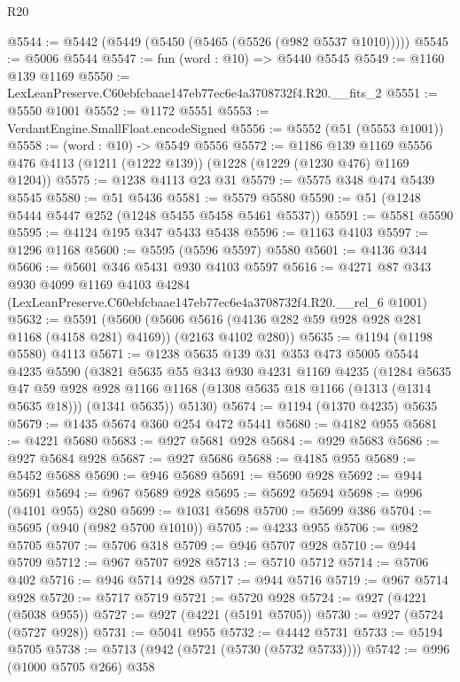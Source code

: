 \begin{lexlean}{R20}
\begin{coremodule}
@5544 := @5442 (@5449 (@5450 (@5465 (@5526 (@982 @5537 @1010)))))
@5545 := @5006 @5544
@5547 := fun (word : @10) => @5440 @5545
@5549 := @1160 @139 @1169
@5550 := LexLeanPreserve.C60ebfcbaae147eb77ec6e4a3708732f4.R20.__fits_2
@5551 := @5550 @1001
@5552 := @1172 @5551
@5553 := VerdantEngine.SmallFloat.encodeSigned
@5556 := @5552 (@51 (@5553 @1001))
@5558 := (word : @10) -> @5549 @5556
@5572 := @1186
    @139
    @1169
    @5556
    @476
    @4113
    (@1211 (@1222 @139))
    (@1228 (@1229 (@1230 @476) @1169 @1204))
@5575 := @1238 @4113 @23 @31
@5579 := @5575 @348 @474 @5439 @5545
@5580 := @51 @5436
@5581 := @5579 @5580
@5590 := @51 (@1248 @5444 @5447 @252 (@1248 @5455 @5458 @5461 @5537))
@5591 := @5581 @5590
@5595 := @4124 @195 @347 @5433 @5438
@5596 := @1163 @4103
@5597 := @1296 @1168
@5600 := @5595 (@5596 @5597) @5580
@5601 := @4136 @344
@5606 := @5601 @346 @5431 @930 @4103 @5597
@5616 := @4271
    @87
    @343
    @930
    @4099
    @1169
    @4103
    @4284
    (LexLeanPreserve.C60ebfcbaae147eb77ec6e4a3708732f4.R20.__rel_6 @1001)
@5632 := @5591
    (@5600
      (@5606 @5616 (@4136 @282 @59 @928 @928 @281 @1168 (@4158 @281) @4169))
      (@2163 @4102 @280))
@5635 := @1194 (@1198 @5580) @4113
@5671 := @1238
    @5635
    @139
    @31
    @353
    @473
    @5005
    @5544
    @4235
    @5590
    (@3821
      @5635
      @55
      @343
      @930
      @4231
      @1169
      @4235
      (@1284
        @5635
        @47
        @59
        @928
        @928
        @1166
        @1168
        (@1308 @5635 @18 @1166 (@1313 (@1314 @5635 @18)))
        (@1341 @5635))
      @5130)
@5674 := @1194 (@1370 @4235) @5635
@5679 := @1435 @5674 @360 @254 @472 @5441
@5680 := @4182 @955
@5681 := @4221 @5680
@5683 := @927 @5681 @928
@5684 := @929 @5683
@5686 := @927 @5684 @928
@5687 := @927 @5686
@5688 := @4185 @955
@5689 := @5452 @5688
@5690 := @946 @5689
@5691 := @5690 @928
@5692 := @944 @5691
@5694 := @967 @5689 @928
@5695 := @5692 @5694
@5698 := @996 (@4101 @955) @280
@5699 := @1031 @5698
@5700 := @5699 @386
@5704 := @5695 (@940 (@982 @5700 @1010))
@5705 := @4233 @955
@5706 := @982 @5705
@5707 := @5706 @318
@5709 := @946 @5707 @928
@5710 := @944 @5709
@5712 := @967 @5707 @928
@5713 := @5710 @5712
@5714 := @5706 @402
@5716 := @946 @5714 @928
@5717 := @944 @5716
@5719 := @967 @5714 @928
@5720 := @5717 @5719
@5721 := @5720 @928
@5724 := @927 (@4221 (@5038 @955))
@5727 := @927 (@4221 (@5191 @5705))
@5730 := @927 (@5724 (@5727 @928))
@5731 := @5041 @955
@5732 := @4442 @5731
@5733 := @5194 @5705
@5738 := @5713 (@942 (@5721 (@5730 (@5732 @5733))))
@5742 := @996 (@1000 @5705 @266) @358

\end{coremodule}
\end{lexlean}
